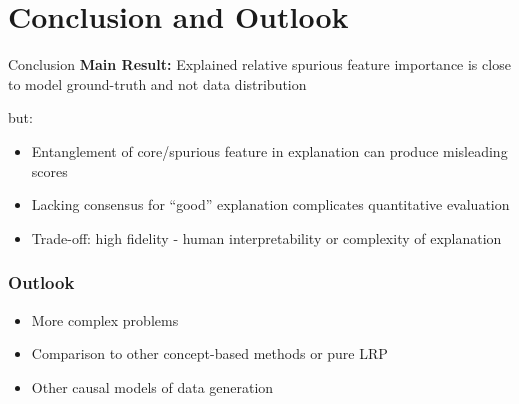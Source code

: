\documentclass[German, aspectratio=169]{beamer}
\begin{document}
\section[Conclusion and Outlook]{Conclusion and Outlook}
\begin{frame}{Conclusion}
    \textbf{Main Result:} Explained relative spurious feature importance is close to model ground-truth and not data distribution

    but:

    \begin{itemize}
        \item Entanglement of core/spurious feature in explanation can produce misleading scores
        \item Lacking consensus for ``good'' explanation complicates quantitative evaluation
        \item Trade-off: high fidelity - human interpretability or complexity of explanation
    \end{itemize}
\end{frame}
\begin{frame}
    \frametitle{Outlook}
    \begin{itemize}
        \item More complex problems
        \item Comparison to other concept-based methods or pure LRP
        \item Other causal models of data generation
    \end{itemize}
    \begin{figure}[t!]
        \centering
    \end{figure}
\end{frame}
\end{document}
